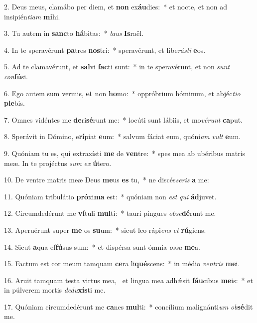 2. Deus meus, clamábo per diem, et \textbf{non} ex\textbf{áu}dies:~*  et nocte, et non ad insipién\textit{ti}\textit{am} \textbf{mi}hi.\

3. Tu autem in \textbf{sanc}to \textbf{há}bitas:~*  \textit{laus} \textbf{Is}raël.\

4. In te speravérunt \textbf{pa}tres \textbf{nos}tri:~*  speravérunt, et libe\textit{rás}\textit{ti} \textbf{e}os.\

5. Ad te clamavérunt, et \textbf{sal}vi \textbf{fac}ti sunt:~*  in te speravérunt, et non \textit{sunt} \textit{con}\textbf{fú}si.\

6. Ego autem sum vermis, \textbf{et} non \textbf{ho}mo:~*  oppróbrium hóminum, et abjéc\textit{ti}\textit{o} \textbf{ple}bis.\

7. Omnes vidéntes me \textbf{de}ri\textbf{sé}runt me:~*  locúti sunt lábiis, et mo\textit{vé}\textit{runt} \textbf{ca}put.\

8. Sperávit in Dómino, e\textbf{rí}piat \textbf{e}um:~*  salvum fáciat eum, quóni\textit{am} \textit{vult} \textbf{e}um.\

9. Quóniam tu es, qui extraxísti \textbf{me} de \textbf{ven}tre:~*  spes mea ab ubéribus matris meæ. In te projéctus \textit{sum} \textit{ex} \textbf{ú}tero.\

10. De ventre matris meæ Deus \textbf{me}us \textbf{es} tu,~*  ne discés\textit{se}\textit{ris} \textbf{a} me:\

11. Quóniam tribulátio \textbf{pró}xi\textbf{ma} est:~*  quóniam non \textit{est} \textit{qui} \textbf{ád}juvet.\

12. Circumdedérunt me \textbf{ví}tuli \textbf{mul}ti:~*  tauri pingues \textit{ob}\textit{se}\textbf{dé}runt me.\

13. Aperuérunt super \textbf{me} os \textbf{su}um:~*  sicut leo rápi\textit{ens} \textit{et} \textbf{rú}giens.\

14. Sicut \textbf{a}qua ef\textbf{fú}sus sum:~*  et dispérsa sunt ómnia \textit{os}\textit{sa} \textbf{me}a.\

15. Factum est cor meum tamquam \textbf{ce}ra li\textbf{qué}scens:~*  in médio \textit{ven}\textit{tris} \textbf{me}i.\

16. Aruit tamquam testa virtus mea, \dag\  et lingua mea adhǽsit \textbf{fáu}cibus \textbf{me}is:~*  et in púlverem mortis \textit{de}\textit{du}\textbf{xís}ti me.\

17. Quóniam circumdedérunt me \textbf{ca}nes \textbf{mul}ti:~*  concílium malignánti\textit{um} \textit{ob}\textbf{sé}dit me.\

